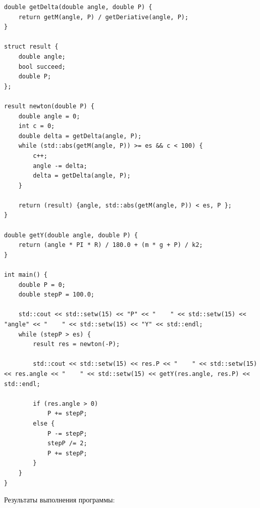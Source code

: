 \documentclass[a4paper,14pt]{extarticle}
\begin{document}
\begin{enumerate}[1. ]
\begin{verbatim}
double getDelta(double angle, double P) {
    return getM(angle, P) / getDeriative(angle, P);
}

struct result {
    double angle;
    bool succeed;
    double P;
};

result newton(double P) {
    double angle = 0;
    int c = 0;
    double delta = getDelta(angle, P);
    while (std::abs(getM(angle, P)) >= es && c < 100) {
        c++;
        angle -= delta;
        delta = getDelta(angle, P);
    }

    return (result) {angle, std::abs(getM(angle, P)) < es, P };   
}

double getY(double angle, double P) {
    return (angle * PI * R) / 180.0 + (m * g + P) / k2;
}

int main() {
    double P = 0;
    double stepP = 100.0;

    std::cout << std::setw(15) << "P" << "    " << std::setw(15) << "angle" << "    " << std::setw(15) << "Y" << std::endl;
    while (stepP > es) {
        result res = newton(-P);
        
        std::cout << std::setw(15) << res.P << "    " << std::setw(15) << res.angle << "    " << std::setw(15) << getY(res.angle, res.P) << std::endl;

        if (res.angle > 0)
            P += stepP;
        else {
            P -= stepP;
            stepP /= 2;
            P += stepP;
        } 
    }
}
    \end{verbatim}
          Результаты выполнения программы:


\end{enumerate}
\end{document}
